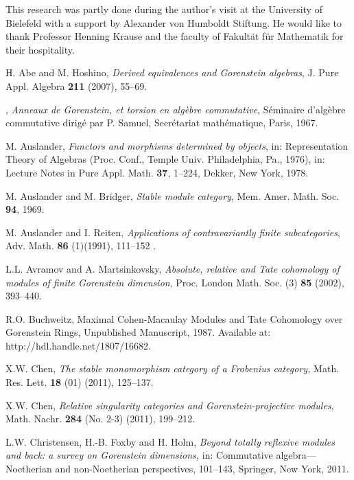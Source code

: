 \documentclass[a4paper]{amsart}
\theoremstyle{definition}
\theoremstyle{remark}
\numberwithin{equation}{section}
\begin{document}
\vskip10pt

 \; This research was partly done during the author's visit at the University of Bielefeld with a support by Alexander von Humboldt Stiftung. He would like to thank Professor Henning Krause and the faculty of Fakult\"{a}t f\"{u}r Mathematik for their hospitality.



\begin{thebibliography}{9999}

 {\sc H. Abe and M. Hoshino,} {\em Derived equivalences and Gorenstein algebras}, J. Pure Appl. Algebra
{\bf 211} (2007), 55--69.

, {\em Anneaux de Gorenstein, et torsion en alg\`{e}bre commutative}, S\'{e}minaire
d'alg\`{e}bre commutative dirig\'{e} par P. Samuel, Secr\'{e}tariat math\'{e}matique, Paris, 1967.

 {\sc M. Auslander}, {\em Functors and morphisms determined by objects}, in: Representation Theory of Algebras (Proc. Conf.,  Temple Univ. Philadelphia, Pa., 1976), in: Lecture Notes in Pure Appl. Math. {\bf 37}, 1--224, Dekker, New York, 1978.

 {\sc M. Auslander and M. Bridger}, {\em Stable module
category}, Mem. Amer. Math. Soc. {\bf 94}, 1969.

 {\sc M. Auslander and I. Reiten}, {\em Applications of contravariantly finite
subcategories}, Adv. Math. {\bf 86} (1)(1991), 111--152 .

 {\sc L.L. Avramov and A. Martsinkovsky,} {\em Absolute, relative and Tate
cohomology of modules of finite Gorenstein dimension}, Proc. London
Math. Soc. (3) {\bf 85} (2002), 393--440.

 {\sc R.O. Buchweitz,} Maximal Cohen-Macaulay Modules
and Tate Cohomology over Gorenstein Rings, Unpublished Manuscript,
1987. Available at: http://hdl.handle.net/1807/16682.

 {\sc X.W. Chen}, {\em The stable monomorphism category of a Frobenius category,}
Math. Res. Lett. {\bf 18} (01) (2011), 125--137.

 {\sc X.W. Chen}, {\em Relative singularity categories and Gorenstein-projective
modules}, Math. Nachr. {\bf 284} (No. 2-3) (2011), 199--212.

  {\sc L.W. Christensen, H.-B. Foxby and H. Holm}, {\em Beyond totally reflexive modules and back: a survey on Gorenstein dimensions, } in: Commutative algebra---Noetherian and non-Noetherian perspectives, 101--143,
     Springer, New York, 2011.


\end{thebibliography}
\end{document}
